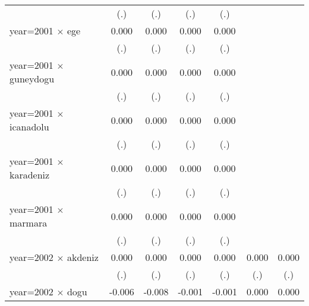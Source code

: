 {\begin{tabular}{l*{6}{c}}
                    &         (.)         &         (.)         &         (.)         &         (.)         &                     &                     \\
year=2001 $\times$ ege&       0.000         &       0.000         &       0.000         &       0.000         &                     &                     \\
                    &         (.)         &         (.)         &         (.)         &         (.)         &                     &                     \\
year=2001 $\times$ guneydogu&       0.000         &       0.000         &       0.000         &       0.000         &                     &                     \\
                    &         (.)         &         (.)         &         (.)         &         (.)         &                     &                     \\
year=2001 $\times$ icanadolu&       0.000         &       0.000         &       0.000         &       0.000         &                     &                     \\
                    &         (.)         &         (.)         &         (.)         &         (.)         &                     &                     \\
year=2001 $\times$ karadeniz&       0.000         &       0.000         &       0.000         &       0.000         &                     &                     \\
                    &         (.)         &         (.)         &         (.)         &         (.)         &                     &                     \\
year=2001 $\times$ marmara&       0.000         &       0.000         &       0.000         &       0.000         &                     &                     \\
                    &         (.)         &         (.)         &         (.)         &         (.)         &                     &                     \\
year=2002 $\times$ akdeniz&       0.000         &       0.000         &       0.000         &       0.000         &       0.000         &       0.000         \\
                    &         (.)         &         (.)         &         (.)         &         (.)         &         (.)         &         (.)         \\
year=2002 $\times$ dogu&      -0.006         &      -0.008         &      -0.001         &      -0.001         &       0.000         &       0.000         \\

\end{tabular}}
